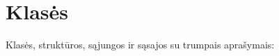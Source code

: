 \section{Klasės}
Klasės, struktūros, sąjungos ir sąsajos su trumpais aprašymais\+:\begin{DoxyCompactList}
\item{}
\item{}
\end{DoxyCompactList}
